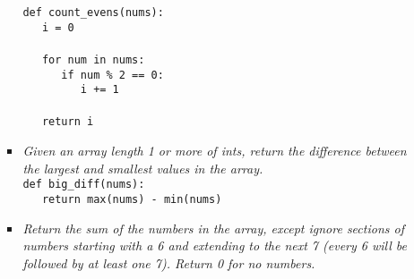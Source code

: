 \documentclass[9pt]{article}
\begin{document}
\begin{enumerate}
\begin{enumerate}
\begin{itemize}
                        \verb|def count_evens(nums):| \\
                        \verb|   i = 0| \\ \\
                        \verb|   for num in nums:| \\
                        \verb|      if num % 2 == 0:| \\
                        \verb|         i += 1| \\ \\
                        \verb|   return i| \\
                  \item \textit{Given an array length 1 or more of ints, return 
                        the difference between the largest and smallest values 
                        in the array.} \\

                        \verb|def big_diff(nums):| \\
                        \verb|   return max(nums) - min(nums)| \\
                  \item \textit{Return the sum of the numbers in the array, 
                        except ignore sections of numbers starting with a 6 and 
                        extending to the next 7 (every 6 will be followed by at 
                        least one 7). Return 0 for no numbers.} \\


\end{itemize}
\end{enumerate}
\end{enumerate}
\end{document}
